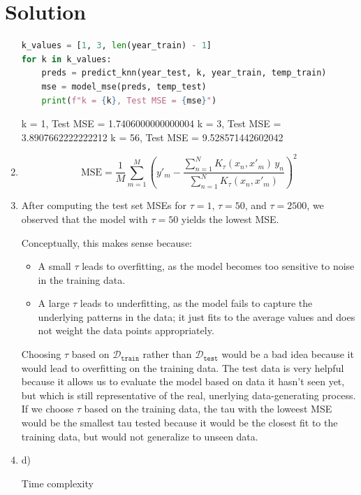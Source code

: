 \documentclass[submit]{../harvardml}
\newenvironment{solution}
  {\color{blue}\section*{Solution}}
{}
\begin{document}
\begin{solution}
\begin{enumerate}
\begin{lstlisting}[language=Python]
    k_values = [1, 3, len(year_train) - 1]
for k in k_values:
    preds = predict_knn(year_test, k, year_train, temp_train)
    mse = model_mse(preds, temp_test)
    print(f"k = {k}, Test MSE = {mse}")

    \end{lstlisting}

    k = 1, Test MSE = 1.7406000000000004 \newline
    k = 3, Test MSE = 3.8907662222222212 \newline
    k = 56, Test MSE = 9.528571442602042

  
  \item 
  

  \[
\text{MSE} = \frac{1}{M} \sum_{m=1}^{M} \left( y'_m - \frac{\sum_{n=1}^{N} K_\tau(x_n, x'_m) \, y_n}{\sum_{n=1}^{N} K_\tau(x_n, x'_m)} \right)^2
\]



  \item 
  
  After computing the test set MSEs for \(\tau = 1\), \(\tau = 50\), and \(\tau = 2500\), we observed that the model with \(\tau = 50\) yields the lowest MSE.


  Conceptually, this makes sense because:
  \begin{itemize}
    \item A small \(\tau\) leads to overfitting, as the model becomes too sensitive to noise in the training data.
    \item A large \(\tau\) leads to underfitting, as the model fails to capture the underlying patterns in the data; it just fits to the average values and does not weight the data points appropriately.
  \end{itemize}

  Choosing \(\tau\) based on \(\mathcal{D}_\texttt{train}\) rather than \(\mathcal{D}_\texttt{test}\) would be a bad idea because it would lead to overfitting on the training data. The test data is very helpful because it allows us to evaluate the model based on data it hasn't seen yet, but which is still representative of the real, unerlying data-generating process. If we choose \(\tau\) based on the training data, the tau with the loweest MSE would be the smallest tau tested because it would be the closest fit to the training data, but would not generalize to unseen data. 


  \item d)
  
  Time complexity


\end{enumerate}
\end{solution}
\end{document}

